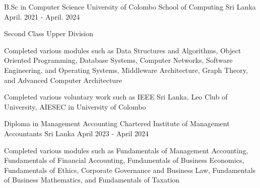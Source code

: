 

\begin{cventries}

  \cventry
    {B.Sc in Computer Science} %
    {University of Colombo School of Computing} %
    {Sri Lanka} %
    {April. 2021 - April. 2024} %
    {
      \begin{cvitems} %
        \item {Second Class Upper Division}
        \item {Completed various modules such as Data Structures and Algorithms, Object Oriented Programming, Database Systems, Computer Networks, Software Engineering, and Operating Systems, Middleware Architecture, Graph Theory, and Advanced Computer Architecture}
        \item {Completed various voluntary work such as IEEE Sri Lanka, Leo Club of University, AIESEC in University of Colombo}
      \end{cvitems}
    }

  \cventry
    {Diploma in Management Accounting} %
    {Chartered Institute of Management Accountants} %
    {Sri Lanka} %
    {April 2023 - April 2024}
    {
      \begin{cvitems} %
        \item {Completed various modules such as Fundamentals of Management Accounting, Fundamentals of Financial Accounting, Fundamentals of Business Economics, Fundamentals of Ethics, Corporate Governance and Business Law, Fundamentals of Business Mathematics, and Fundamentals of Taxation}
      \end{cvitems}
    }

\end{cventries}
